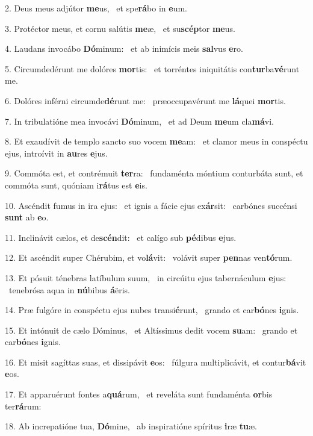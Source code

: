 2. Deus meus adjútor \textbf{me}us, \ast\  et spe\textbf{rá}bo in \textbf{e}um.\

3. Protéctor meus, et cornu salútis \textbf{me}æ, \ast\  et su\textbf{scép}tor \textbf{me}us.\

4. Laudans invocábo \textbf{Dó}minum: \ast\  et ab inimícis meis \textbf{sal}vus \textbf{e}ro.\

5. Circumdedérunt me dolóres \textbf{mor}tis: \ast\  et torréntes iniquitátis con\textbf{tur}ba\textbf{vé}runt me.\

6. Dolóres inférni circumde\textbf{dé}runt me: \ast\  præoccupavérunt me \textbf{lá}quei \textbf{mor}tis.\

7. In tribulatióne mea invocávi \textbf{Dó}minum, \ast\  et ad Deum \textbf{me}um cla\textbf{má}vi.\

8. Et exaudívit de templo sancto suo vocem \textbf{me}am: \ast\  et clamor meus in conspéctu ejus, introívit in \textbf{au}res \textbf{e}jus.\

9. Commóta est, et contrémuit \textbf{ter}ra: \ast\  fundaménta móntium conturbáta sunt, et commóta sunt, quóniam i\textbf{rá}tus est \textbf{e}is.\

10. Ascéndit fumus in ira ejus: \dag\  et ignis a fácie ejus ex\textbf{ár}sit: \ast\  carbónes succénsi \textbf{sunt} ab \textbf{e}o.\

11. Inclinávit cælos, et de\textbf{scén}dit: \ast\  et calígo sub \textbf{pé}dibus \textbf{e}jus.\

12. Et ascéndit super Chérubim, et vo\textbf{lá}vit: \ast\  volávit super \textbf{pen}nas ven\textbf{tó}rum.\

13. Et pósuit ténebras latíbulum suum, \dag\  in circúitu ejus tabernáculum \textbf{e}jus: \ast\  tenebrósa aqua in \textbf{nú}bibus \textbf{á}ëris.\

14. Præ fulgóre in conspéctu ejus nubes transi\textbf{é}runt, \ast\  grando et car\textbf{bó}nes \textbf{i}gnis.\

15. Et intónuit de cælo Dóminus, \dag\  et Altíssimus dedit vocem \textbf{su}am: \ast\  grando et car\textbf{bó}nes \textbf{i}gnis.\

16. Et misit sagíttas suas, et dissipávit \textbf{e}os: \ast\  fúlgura multiplicávit, et contur\textbf{bá}vit \textbf{e}os.\

17. Et apparuérunt fontes a\textbf{quá}rum, \ast\  et reveláta sunt fundaménta \textbf{or}bis ter\textbf{rá}rum:\

18. Ab increpatióne tua, \textbf{Dó}mine, \ast\  ab inspiratióne spíritus \textbf{i}ræ \textbf{tu}æ.\


